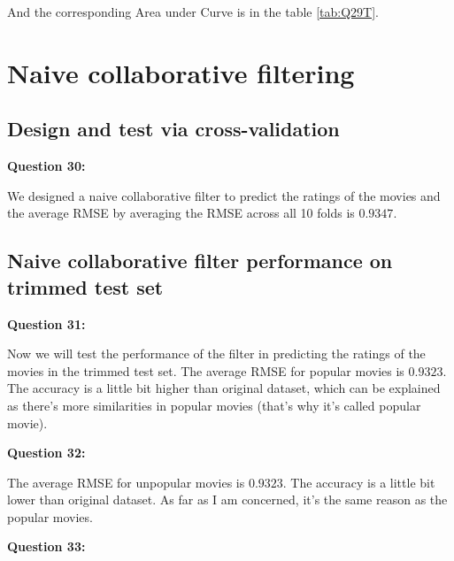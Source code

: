 \documentclass{article}
\begin{document}
And the corresponding Area under Curve is in the table \ref{tab:Q29T}.

\begin{table}[h]
\center
\caption{AUC values of different thresholds}
\label{tab:Q29T}
\end{table}




\section{Naive collaborative filtering}

\subsection{Design and test via cross-validation}

\bigbreak \textbf{Question 30:}

We designed a naive collaborative filter to predict the ratings of the movies and the average RMSE by averaging the RMSE across all 10 folds is $0.9347$.

\subsection{Naive collaborative filter performance on trimmed test set}

\bigbreak \textbf{Question 31:}

Now we will test the performance of the filter in predicting the ratings of the movies in the trimmed test set. The average RMSE for popular movies is $0.9323$. The accuracy is a little bit higher than original dataset, which can be explained as there's more similarities in popular movies (that's why it's called popular movie).

\bigbreak \textbf{Question 32:}

The average RMSE for unpopular movies is $0.9323$. The accuracy is a little bit lower than original dataset. As far as I am concerned, it's the same reason as the popular movies.

\bigbreak \textbf{Question 33:}
\end{document}
